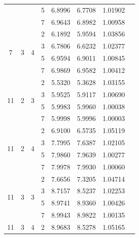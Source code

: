 \documentclass[a4paper,11pt,reqno]{article}
\theoremstyle{plain} \numberwithin{equation}{section}
\theoremstyle{definition}
\begin{document}
\begin{appendices}
\begin{table}[!ht]
\begin{tabular}{|c|c|c|c|c|c|c|c|}
                    &                    &                    & 5   & 6.8996 & 6.7708 & 1.01902 \\
                    &                    &                    & 7   & 6.9643 & 6.8982 & 1.00958 \\
\hline
\multirow{4}{*}{7}  & \multirow{4}{*}{3} & \multirow{4}{*}{4} & 2   & 6.1892 & 5.9594 & 1.03856 \\
                    &                    &                    & 3   & 6.7806 & 6.6232 & 1.02377 \\
                    &                    &                    & 5   & 6.9594 & 6.9011 & 1.00845 \\
                    &                    &                    & 7   & 6.9869 & 6.9582 & 1.00412 \\
\hline
\multirow{4}{*}{11} & \multirow{4}{*}{2} & \multirow{4}{*}{3} & 2   & 5.5320 & 5.3628 & 1.03155 \\
                    &                    &                    & 3   & 5.9525 & 5.9117 & 1.00690 \\
                    &                    &                    & 5   & 5.9983 & 5.9960 & 1.00038 \\
                    &                    &                    & 7   & 5.9998 & 5.9996 & 1.00003 \\
\hline
\multirow{4}{*}{11} & \multirow{4}{*}{2} & \multirow{4}{*}{4} & 2   & 6.9100 & 6.5735 & 1.05119 \\
                    &                    &                    & 3   & 7.7995 & 7.6387 & 1.02105 \\
                    &                    &                    & 5   & 7.9860 & 7.9639 & 1.00277 \\
                    &                    &                    & 7   & 7.9978 & 7.9930 & 1.00060 \\
\hline
\multirow{4}{*}{11} & \multirow{4}{*}{3} & \multirow{4}{*}{3} & 2   & 7.6656 & 7.3205 & 1.04714 \\
                    &                    &                    & 3   & 8.7157 & 8.5237 & 1.02253 \\
                    &                    &                    & 5   & 8.9741 & 8.9360 & 1.00426 \\
                    &                    &                    & 7   & 8.9943 & 8.9822 & 1.00135 \\
\hline
\multirow{4}{*}{11} & \multirow{4}{*}{3} & \multirow{4}{*}{4} & 2   & 8.9683 & 8.5278 & 1.05165 \\

\end{tabular}
\end{table}
\end{appendices}
\end{document}
